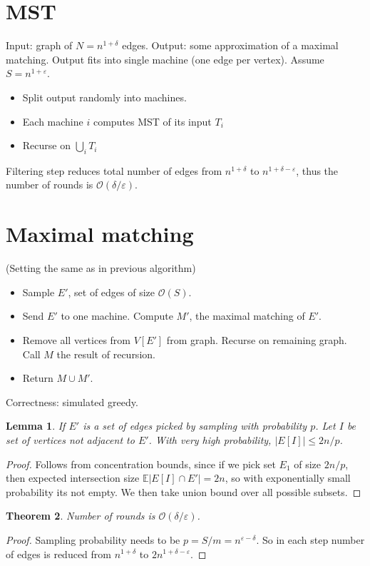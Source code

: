 \documentclass[11pt]{article}
\newtheorem{theorem}{Theorem}
\newtheorem{lemma}[theorem]{Lemma}
\newcommand{\bigo}{\mathcal{O}}
\begin{document}
\section{MST}
Input: graph of $N = n^{1+\delta}$ edges. Output: some approximation of a maximal matching. Output fits into single machine (one edge per vertex). Assume $S = n^{1+\varepsilon}$.
\begin{itemize}
\item Split output randomly into machines.
\item Each machine $i$ computes MST of its input $T_i$
\item Recurse on $\bigcup_i T_i$
\end{itemize}

Filtering step reduces total number of edges from $n^{1+\delta}$ to $n^{1+\delta-\varepsilon}$, thus the number of rounds is $\bigo(\delta/\varepsilon)$.


\section{Maximal matching}
(Setting the same as in previous algorithm)

\begin{itemize}
\item Sample $E'$, set of edges of size $\bigo(S)$. 
\item Send $E'$ to one machine. Compute $M'$, the maximal matching of $E'$.
\item Remove all vertices from $V[E']$ from graph. Recurse on remaining graph. Call $M$ the result of recursion.
\item Return $M \cup M'$.
\end{itemize}

Correctness: simulated greedy. 
\begin{lemma}If $E'$ is a set of edges picked by sampling with probability $p$. Let $I$ be set of vertices not adjacent to $E'$. With very high probability, $|E[I]| \le 2n/p$. 
\end{lemma}
\begin{proof}
Follows from concentration bounds, since if we pick set $E_1$ of size $2n/p$, then expected intersection size $\mathbb{E} | E[I] \cap E' | = 2n$, so with exponentially small probability its not empty. We then take union bound over all possible subsets.
\end{proof}
\begin{theorem}
Number of rounds is $\bigo(\delta/\varepsilon)$.
\end{theorem}
\begin{proof}
Sampling probability needs to be $p = S/m = n^{\varepsilon-\delta}$. So in each step number of edges is reduced from $n^{1+\delta}$ to $2n^{1+\delta-\varepsilon}$.
\end{proof}
\end{document}
